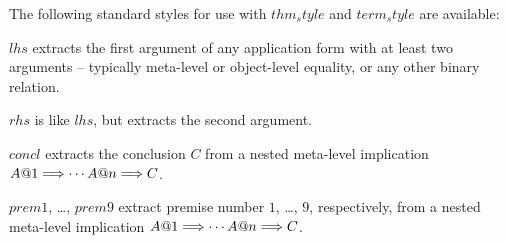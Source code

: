 \medskip

The following standard styles for use with $thm_style$ and $term_style$ are
available:

\begin{descr}
  
\item [$lhs$] extracts the first argument of any application form with at
  least two arguments -- typically meta-level or object-level equality, or any
  other binary relation.
  
\item [$rhs$] is like $lhs$, but extracts the second argument.
  
\item [$concl$] extracts the conclusion $C$ from a nested meta-level
  implication $A@1 \Longrightarrow \cdots A@n \Longrightarrow C$.
  
\item [$prem1$, \dots, $prem9$] extract premise number $1$, \dots, $9$,
  respectively, from a nested meta-level implication $A@1 \Longrightarrow \cdots A@n \Longrightarrow
  C$.

\end{descr}

\medskip

